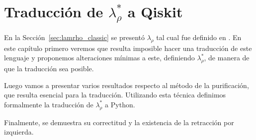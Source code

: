 \chapter{\texorpdfstring{Traducción de $\lambda_\rho^*$ a Qiskit}{Traducción de Lambda Rho* a Qiskit}}
\label{ch:traduccion}

En la Sección~\ref{sec:lamrho_classic} se presentó $\lambda_\rho$ tal cual fue definido en \cite{lamrho}. En este capítulo primero veremos que resulta imposible hacer una traducción de este lenguaje y proponemos alteraciones mínimas a este, definiendo $\lambda_\rho^*$, de manera de que la traducción sea posible.

Luego vamos a presentar varios resultados respecto al método de la purificación, que resulta esencial para la traducción. Utilizando esta técnica definimos formalmente la traducción de $\lambda_\rho^*$ a Python.

Finalmente, se demuestra su correctitud y la existencia de la retracción por izquierda.

